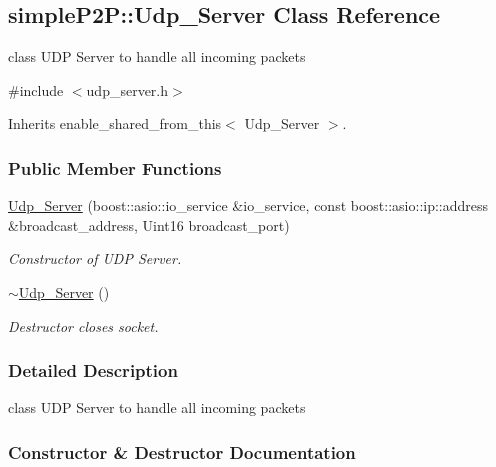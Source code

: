 \hypertarget{classsimpleP2P_1_1Udp__Server}{}\subsection{simple\+P2P\+:\+:Udp\+\_\+\+Server Class Reference}
\label{classsimpleP2P_1_1Udp__Server}


class U\+DP Server to handle all incoming packets  




{\ttfamily \#include $<$udp\+\_\+server.\+h$>$}



Inherits enable\+\_\+shared\+\_\+from\+\_\+this$<$ Udp\+\_\+\+Server $>$.

\subsubsection*{Public Member Functions}
\begin{DoxyCompactItemize}
\item 
\hyperlink{classsimpleP2P_1_1Udp__Server_ad2e7873688dea22fa7db5ae1ef86ba6f}{Udp\+\_\+\+Server} (boost\+::asio\+::io\+\_\+service \&io\+\_\+service, const boost\+::asio\+::ip\+::address \&broadcast\+\_\+address, Uint16 broadcast\+\_\+port)
\begin{DoxyCompactList}\small\item\em Constructor of U\+DP Server. \end{DoxyCompactList}\item 
\mbox{\label{classsimpleP2P_1_1Udp__Server_adde5307f34477b9bca29f8e2cb9077b0}} 
\hyperlink{classsimpleP2P_1_1Udp__Server_adde5307f34477b9bca29f8e2cb9077b0}{$\sim$\+Udp\+\_\+\+Server} ()
\begin{DoxyCompactList}\small\item\em Destructor closes socket. \end{DoxyCompactList}\end{DoxyCompactItemize}


\subsubsection{Detailed Description}
class U\+DP Server to handle all incoming packets 

\subsubsection{Constructor \& Destructor Documentation}
\mbox{\label{classsimpleP2P_1_1Udp__Server_ad2e7873688dea22fa7db5ae1ef86ba6f}} 
